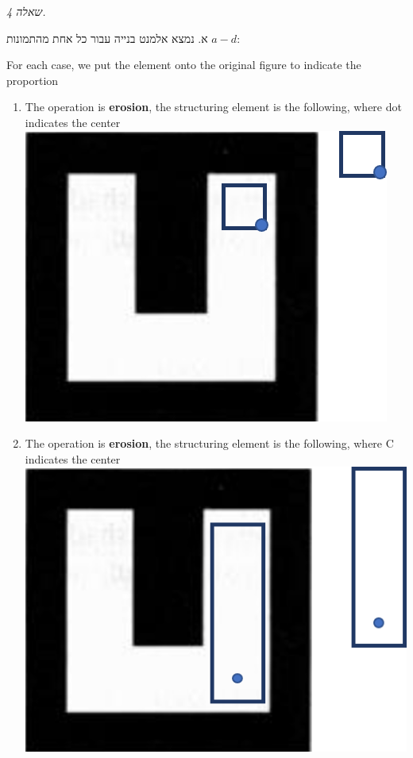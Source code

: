 \documentclass[a4paper]{iacas}
\begin{document}



\newpage

\begin{hebrew}
\textit{\huge שאלה 4.}

א. נמצא אלמנט בנייה עבור כל אחת מהתמונות $a-d$:
\end{hebrew}

For each case, we put the element onto the original figure to indicate the proportion

\begin{enumerate}[label=(\alph*.)]

\item The operation is \textbf{erosion}, the structuring element is the following, where dot indicates the center
\newline
\newline
\includegraphics{imgs/q3_11.png}
\item The operation is \textbf{erosion}, the structuring element is the following, where C indicates the center
\newline
\newline
\includegraphics{imgs/q3_12.png}

\end{enumerate}
\end{document}
